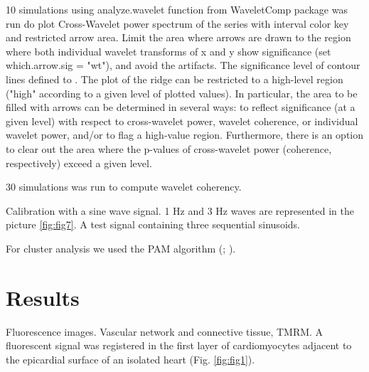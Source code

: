 \documentclass{biophys-new}
\begin{document}
10 simulations using analyze.wavelet function from WaveletComp package was run do plot Cross-Wavelet power spectrum of the series with interval color key and restricted arrow area.
Limit the area where arrows are drawn to the region where both individual wavelet transforms of x and y show significance (set which.arrow.sig = "wt"), and avoid the artifacts.
The significance level of contour lines defined to . The plot of the ridge can be restricted to a high-level region ("high" according to a given level of plotted values).
In particular, the area to be filled with arrows can be determined in several ways: to reflect significance (at a given level) with respect to cross-wavelet power, wavelet coherence, or individual wavelet power, and/or to flag a high-value region. Furthermore, there is an option to clear out the area where the p-values of cross-wavelet power (coherence, respectively) exceed a given level.

30 simulations was run to compute wavelet coherency.

Calibration with a sine wave signal.
1 Hz and 3 Hz waves are represented in the picture \ref{fig:fig7}.
A test signal containing three sequential sinusoids.

For cluster analysis we used the PAM algorithm (\cite{kaufman2009finding}; \cite{kassambara2017practical}).


\section*{Results}


Fluorescence images.
Vascular network and connective tissue, TMRM.
A fluorescent signal was registered in the first layer of cardiomyocytes adjacent to the epicardial surface of an isolated heart (Fig. \ref{fig:fig1}).
\end{document}
